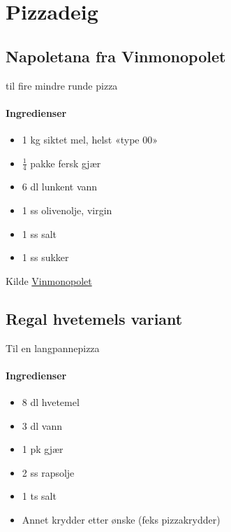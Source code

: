 \section{﻿Pizzadeig}

\subsection{Napoletana fra Vinmonopolet}
til fire mindre runde pizza
\paragraph{Ingredienser}
\begin{itemize}[noitemsep]
	\item 1 kg siktet mel, helst «type 00»
	\item $\frac{1}{4}$  pakke fersk gjær
	\item 6 dl lunkent vann
	\item 1 ss olivenolje, virgin
	\item 1 ss salt
	\item 1 ss sukker
\end{itemize}


Kilde \href{http://www.vinmonopolet.no/artikkel/mat-og-drikke/kombinasjoner-med-mat/pizza/drikke-til-pizza}{Vinmonopolet}


\subsection{Regal hvetemels variant}
Til en langpannepizza

\paragraph{Ingredienser}
\begin{itemize}[noitemsep]
	\item 8 dl hvetemel
	\item 3 dl vann
	\item 1 pk gjær
	\item 2 ss rapsolje
	\item 1 ts salt
	\item Annet krydder etter ønske (feks pizzakrydder)
\end{itemize}

